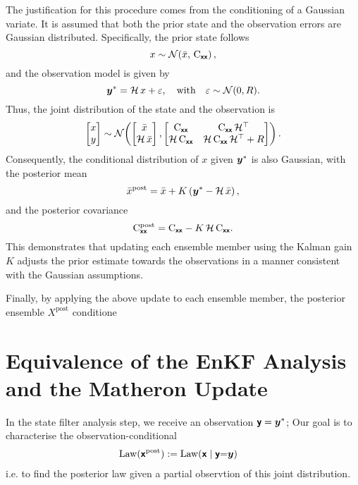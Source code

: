 \documentclass{article}
\begin{document}
{{The justification for this procedure comes from the conditioning of a Gaussian variate. It is assumed that both the prior state and the observation errors are Gaussian distributed. Specifically, the prior state follows
\[
x \sim \mathcal{N}\!\left(\bar{x},\, \mathrm{C}_{\boldsymbol{\mathsf{xx}}}\right),
\]
and the observation model is given by
\[
\boldsymbol{y}^* = \mathcal{H}\, x + \varepsilon, \quad \text{with} \quad \varepsilon \sim \mathcal{N}(0, R).
\]
Thus, the joint distribution of the state and the observation is
\[
\begin{bmatrix}
x \\
y
\end{bmatrix}
\sim \mathcal{N}\!\left(
\begin{bmatrix}
\bar{x} \\
\mathcal{H}\, \bar{x}
\end{bmatrix},
\begin{bmatrix}
\mathrm{C}_{\boldsymbol{\mathsf{xx}}} & \mathrm{C}_{\boldsymbol{\mathsf{xx}}}\, \mathcal{H}^\top \\
\mathcal{H}\, \mathrm{C}_{\boldsymbol{\mathsf{xx}}} & \mathcal{H}\, \mathrm{C}_{\boldsymbol{\mathsf{xx}}}\, \mathcal{H}^\top + R
\end{bmatrix}
\right).
\]
Consequently, the conditional distribution of \( x \) given \( \boldsymbol{y}^* \) is also Gaussian, with the posterior mean
\[
\bar{x}^{\text{post}} = \bar{x} + K \left(\boldsymbol{y}^* - \mathcal{H}\, \bar{x}\right),
\]
and the posterior covariance
\[
\mathrm{C}_{\boldsymbol{\mathsf{xx}}}^{\text{post}} = \mathrm{C}_{\boldsymbol{\mathsf{xx}}} - K\, \mathcal{H}\, \mathrm{C}_{\boldsymbol{\mathsf{xx}}}.
\]
This demonstrates that updating each ensemble member using the Kalman gain \( K \) adjusts the prior estimate towards the observations in a manner consistent with the Gaussian assumptions.

Finally, by applying the above update to each ensemble member, the posterior ensemble \( X^{\text{post}} \) conditione

\section{Equivalence of the EnKF Analysis and the Matheron Update}


In the state filter analysis step, we receive an observation $\boldsymbol{\mathsf{y}}=\boldsymbol{y}^*$;
Our goal is to characterise the observation-conditional
\begin{align}
    \operatorname{Law}(\boldsymbol{\mathsf{x}}^{\text{post}})&:=\operatorname{Law}(\boldsymbol{\mathsf{x}}\mid \boldsymbol{\mathsf{y}}{=}\boldsymbol{y})
\end{align}
i.e. to find the posterior law given a partial observtion of this joint distribution.

}}
\end{document}
